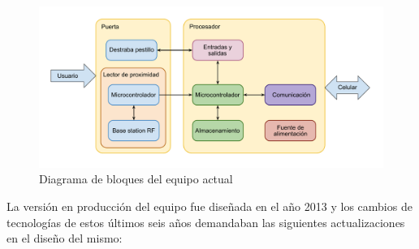 \begin{figure}[ht]
	\centering
	\includegraphics[width=\textwidth]{./Figures/BloquesActual.pdf}
	\caption{Diagrama de bloques del equipo actual}
	\label{fig:BloquesActual}
\end{figure}

La versión en producción del equipo fue diseñada en el año 2013 y los cambios de tecnologías de estos últimos seis años demandaban las siguientes actualizaciones en el diseño del mismo:

